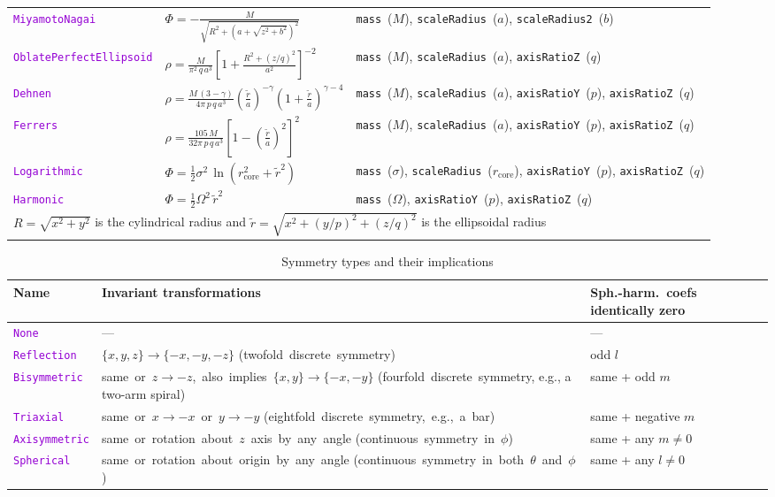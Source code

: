 \documentclass[12pt]{article}
\newcommand{\ttt}[1]{\textcolor{darkviolet}{\texttt{#1}}}
\newcommand{\ppp}[1]{\textcolor{darkolive} {\texttt{#1}}}
\begin{document}
\begin{table}
\begin{tabular}{l m{5cm} >{\raggedright\arraybackslash}m{6cm}}
\ttt{MiyamotoNagai} & $\Phi = -\frac{M}{\sqrt{R^2 + \left(a + \sqrt{z^2+b^2}\right)^2}}$ & \ppp{mass}~($M$), \ppp{scaleRadius}~($a$), \ppp{scaleRadius2}~($b$) \\[2mm]
\ttt{OblatePerfectEllipsoid}\!\! & $\rho = \frac{M}{\pi^2\,q\,a^3} \left[ 1 + \frac{R^2+(z/q)^2}{a^2} \right]^{-2}$ &  \ppp{mass}~($M$), \ppp{scaleRadius}~($a$), \ppp{axisRatioZ}~($q$) \\[2mm]
\ttt{Dehnen} & $\rho = \frac{M\,(3-\gamma)}{4\pi\,p\,q\,a^3} \left(\frac{\tilde r}a\right)^{-\gamma} \left(1+\frac{\tilde r}a\right)^{\gamma-4}$\!\! &  \ppp{mass}~($M$), \ppp{scaleRadius}~($a$), \ppp{axisRatioY}~($p$), \ppp{axisRatioZ}~($q$) \\[2mm]
\ttt{Ferrers} & $\rho = \frac{105\,M}{32\pi\,p\,q\,a^3} \left[1 - \left(\frac{\tilde r}a\right)^2\right]^2$ & \ppp{mass}~($M$), \ppp{scaleRadius}~($a$), \ppp{axisRatioY}~($p$), \ppp{axisRatioZ}~($q$) \\[2mm]
\ttt{Logarithmic} & $\Phi = \frac{1}{2} \sigma^2\,\ln(r_\mathrm{core}^2 + \tilde r^2)$ & \ppp{mass}~($\sigma$), \ppp{scaleRadius}~($r_\mathrm{core}$), \ppp{axisRatioY}~($p$), \ppp{axisRatioZ}~($q$) \\[2mm]
\ttt{Harmonic} & $\Phi = \frac{1}{2} \Omega^2\,\tilde r^2$ & \ppp{mass}~($\Omega$), \ppp{axisRatioY}~($p$), \ppp{axisRatioZ}~($q$) \\[2mm]
\multicolumn{3}{l}{\footnotesize $R=\sqrt{x^2+y^2}$ is the cylindrical radius and $\tilde r=\sqrt{x^2+(y/p)^2+(z/q)^2}$ is the ellipsoidal radius}
\end{tabular}
\end{table}

\begin{table}
\caption{Symmetry types and their implications}  \label{tab:Symmetry}
\renewcommand{\arraystretch}{1.25}
\begin{tabular}{l m{9.2cm} m{3.5cm}}
Name & Invariant transformations & \mbox{Sph.-harm.~coefs} identically zero \\
\hline
\ttt{None} & --- & --- \\[2mm]
\ttt{Reflection} & \mbox{$\{x,y,z\} \to \{-x,-y,-z\}$} \mbox{(twofold discrete symmetry)} & odd $l$ \\
\ttt{Bisymmetric} & \mbox{same or $z \to -z$, also implies $\{x,y\} \to \{-x,-y\}$} \mbox{(fourfold discrete symmetry}, e.g., a two-arm spiral) & same + odd $m$ \\
\ttt{Triaxial} & \mbox{same or $x \to -x$ or $y \to -y$} \mbox{(eightfold discrete symmetry, e.g., a bar)} & same + negative $m$ \\
\ttt{Axisymmetric} & \mbox{same or rotation about $z$ axis by any angle} \mbox{(continuous symmetry in $\phi$)} & same + any $m \ne 0$ \\
\ttt{Spherical} & \mbox{same or rotation about origin by any angle} \mbox{(continuous symmetry in both $\theta$ and $\phi$)} & same + any $l \ne 0$
\end{tabular}
\end{table}
\end{document}
